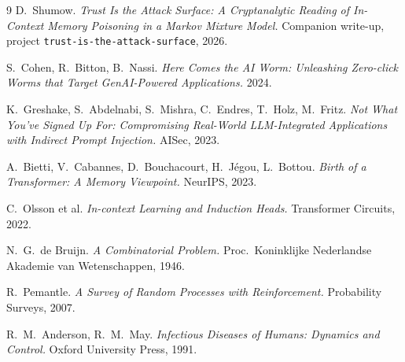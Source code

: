\documentclass[11pt]{article}
\theoremstyle{plain}
\theoremstyle{definition}
\theoremstyle{remark}
\begin{document}
\begin{thebibliography}{9}
 D.\ Shumow. \emph{Trust Is the Attack Surface: A Cryptanalytic Reading
of In-Context Memory Poisoning in a Markov Mixture Model.} Companion write-up, project
\texttt{trust-is-the-attack-surface}, 2026.

 S.\ Cohen, R.\ Bitton, B.\ Nassi. \emph{Here Comes the AI Worm: Unleashing
Zero-click Worms that Target GenAI-Powered Applications.} 2024.

 K.\ Greshake, S.\ Abdelnabi, S.\ Mishra, C.\ Endres, T.\ Holz,
M.\ Fritz. \emph{Not What You've Signed Up For: Compromising Real-World LLM-Integrated
Applications with Indirect Prompt Injection.} AISec, 2023.

 A.\ Bietti, V.\ Cabannes, D.\ Bouchacourt, H.\ J\'egou, L.\ Bottou.
\emph{Birth of a Transformer: A Memory Viewpoint.} NeurIPS, 2023.

 C.\ Olsson et al. \emph{In-context Learning and Induction Heads.}
Transformer Circuits, 2022.

 N.\ G.\ de Bruijn. \emph{A Combinatorial Problem.} Proc.\ Koninklijke
Nederlandse Akademie van Wetenschappen, 1946.

 R.\ Pemantle. \emph{A Survey of Random Processes with Reinforcement.}
Probability Surveys, 2007.

 R.\ M.\ Anderson, R.\ M.\ May. \emph{Infectious Diseases of Humans:
Dynamics and Control.} Oxford University Press, 1991.
\end{thebibliography}
\end{document}
